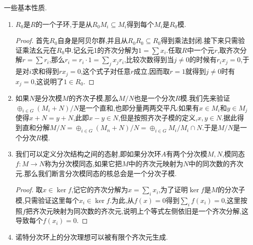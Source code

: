 一些基本性质.
\begin{enumerate}
	\item $R_0$是$R$的一个子环,于是从$R_0M_i\subseteq M_i$得到每个$M_i$是$R_0$模.
	\begin{proof}
		
		首先$R_0$自身是阿贝尔群,并且从$R_0R_0\subseteq R_0$得到乘法封闭.接下来只需验证乘法幺元在$R_0$中.记幺元1的齐次分解为$1=\sum x_i$.任取$R$中一个元$r$,取齐次分解$r=\sum r_i$,那么$r_i=r_i\cdot1=\sum_j x_jr_i$,比较次数得到当$j\not=0$的时候有$r_ix_j=0$,于是对$i$求和得到$rx_j=0$,这个式子对任意$r$成立,因而取$r=1$就得到$j\not=0$时有$x_j=0$,这说明了$1\in R_0$.
	\end{proof}
	\item 如果$N$是分次模$M$的齐次子模,那么$M/N$也是一个分次$R$模.我们先来验证$\oplus_{i\in G}(M_i+N)/N$是一个直和,也即分量两两交平凡:如果有$x\in M_i$和$y\in M_j$使得$x+N=y+N$,此即$x-y\in N$,但是按照齐次子模的定义,$x,y\in N$.据此得到直和分解$M/N=\oplus_{i\in G}(M_n+N)/N=\oplus_{i\in G}M_i/M_i\cap N$.于是$M/N$是一个分次$R$模.
	\item 我们可以定义分次结构之间的态射,即如果分次环$A$有两个分次模$M,N$,模同态$f:M\to N$称为分次模同态,如果它把$M$中的齐次元映射为$N$中的同次数的齐次元.那么我们断言分次模同态的核总会是一个分次子模.
	\begin{proof}
		
		取$x\in\ker f$,记它的齐次分解为$x=\sum_ix_i$,为了证明$\ker f$是$M$的分次子模,只需验证这里每个$x_i\in\ker f$.为此,从$f(x)=0$得到$\sum_if(x_i)=0$,这里按照$f$把齐次元映射为同次数的齐次元,说明上个等式左侧依旧是一个齐次分解,这导致每个$f(x_i)=0$.
	\end{proof}
	\item 诺特分次环上的分次理想可以被有限个齐次元生成.
\end{enumerate}

